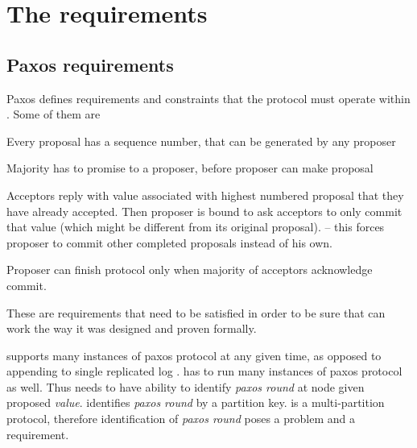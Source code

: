 
\section{The requirements}\label{sec:mpp:requirements}

\subsection{Paxos requirements}
Paxos defines requirements and constraints that the protocol must operate within \cite{lamport2001paxosMadeSimple}. Some of them are \begin{enumerate*}
  \item Every proposal has a sequence number, that can be generated by any proposer
  \item Majority has to promise to a proposer, before proposer can make proposal
  \item Acceptors reply with value associated with highest numbered proposal that they have already accepted. Then proposer is bound to ask acceptors to only commit that value (which might be different from its original proposal). -- this forces proposer to commit other completed proposals instead of his own.
  \item Proposer can finish protocol only when majority of acceptors acknowledge commit.
\end{enumerate*}
These are requirements that need to be satisfied in order to be sure that \paxos can work the way it was designed and proven formally. 

\lwt supports many instances of paxos protocol at any given time, as opposed to appending to single replicated log \cite{chandra2007PaxosMadeLive}. \mpp has to run many instances of paxos protocol as well. Thus \mpp needs to have ability to identify \emph{paxos round} at node given proposed \emph{value}. \lwt identifies \emph{paxos round} by a partition key. \mpp is a multi-partition protocol, therefore identification of \emph{paxos round} poses a problem and a requirement.




